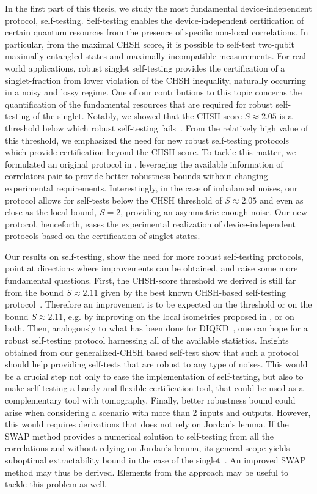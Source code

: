 In the first part of this thesis, we study the most fundamental device-independent protocol, self-testing.
Self-testing enables the device-independent certification of certain quantum resources from the presence of specific non-local correlations.
In particular, from the maximal CHSH score, it is possible to self-test two-qubit maximally entangled states and maximally incompatible measurements.
For real world applications, robust singlet self-testing provides the certification of a singlet-fraction from lower violation of the CHSH inequality, naturally occurring in a noisy and lossy regime. 
One of our contributions to this topic concerns the quantification of the fundamental resources that are required for robust self-testing of the singlet.
Notably, we showed that the CHSH score $S\approx 2.05$ is a threshold below which robust self-testing fails~\cite{Valcarce2020}.
From the relatively high value of this threshold, we emphasized the need for new robust self-testing protocols which provide certification beyond the CHSH score.
To tackle this matter, we formulated an original protocol in \cite{Valcarce2022}, leveraging the available information of correlators pair to provide better robustness bounds without changing experimental requirements.
Interestingly, in the case of imbalanced noises, our protocol allows for self-tests below the CHSH threshold of $S\approx 2.05$ and even as close as the local bound, $S=2$, providing an asymmetric enough noise. 
Our new protocol, henceforth, eases the experimental realization of device-independent protocols based on the certification of singlet states.


\medbreak

Our results on self-testing, show the need for more robust self-testing protocols, point at directions where improvements can be obtained, and raise some more fundamental questions.
First, the CHSH-score threshold we derived is still far from the bound $S\approx 2.11$ given by the best known CHSH-based self-testing protocol~\cite{Kaniewski2016}.
Therefore an improvement is to be expected on the threshold or on the bound $S\approx 2.11$, e.g. by improving on the local isometries proposed in \cite{Kaniewski2016}, or on both.
Then, analogously to what has been done for DIQKD~\cite{Brown2021}, one can hope for a robust self-testing protocol harnessing all of the available statistics.
Insights obtained from our generalized-CHSH based self-test show that such a protocol should help providing self-tests that are robust to any type of noises.
This would be a crucial step not only to ease the implementation of self-testing, but also to make self-testing a handy and flexible certification tool, that could be used as a complementary tool with tomography.
Finally, better robustness bound could arise when considering a scenario with more than 2 inputs and outputs.
However, this would requires derivations that does not rely on Jordan's lemma.
If the SWAP method provides a numerical solution to self-testing from all the correlations and without relying on Jordan's lemma, its general scope yields suboptimal extractability bound in the case of the singlet~\cite{Yang2014,Bancal2015}.
An improved SWAP method may thus be derived.
Elements from the approach \cite{Brown2021} may be useful to tackle this problem as well.

